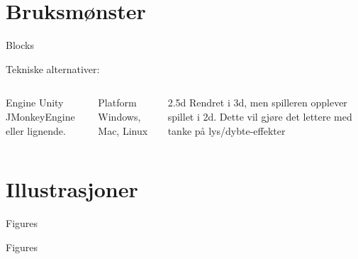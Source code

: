\documentclass[10pt]{beamer}
\begin{document}
	\section{Bruksmønster}
	
	\begin{frame}{Blocks}

          Tekniske alternativer:
		
		\begin{columns}[T,onlytextwidth]
			\begin{block}{Engine}
			  Unity
              JMonkeyEngine
              eller lignende.
			\end{block}
			
			\begin{block}{Platform}
				Windows, Mac, Linux
			\end{block}
			
			\begin{block}{2.5d}
			  Rendret i 3d, men spilleren opplever spillet i 2d.
              Dette vil gjøre det lettere med tanke på lys/dybte-effekter
			\end{block}
				
		\end{columns}

	\end{frame}
	
	\section{Illustrasjoner}
	
	\begin{frame}{Figures}
		
   	  
	\end{frame}
	
	\begin{frame}{Figures}
		
   	  
	\end{frame}
\end{document}

